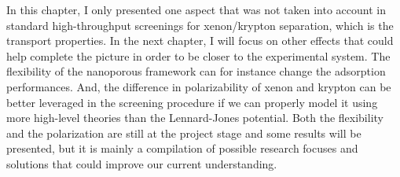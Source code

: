 \documentclass[main]{subfiles}
\begin{document}
In this chapter, I only presented one aspect that was not taken into account in standard high-throughput screenings for xenon/krypton separation, which is the transport properties. In the next chapter, I will focus on other effects that could help complete the picture in order to be closer to the experimental system. The flexibility of the nanoporous framework can for instance change the adsorption performances.\autocite{Witman_2017} And, the difference in polarizability of xenon and krypton can be better leveraged in the screening procedure if we can properly model it using more high-level theories than the Lennard-Jones potential. Both the flexibility and the polarization are still at the project stage and some results will be presented, but it is mainly a compilation of possible research focuses and solutions that could improve our current understanding. 

\OnlyInSubfile{\printglobalbibliography}
\end{document}
